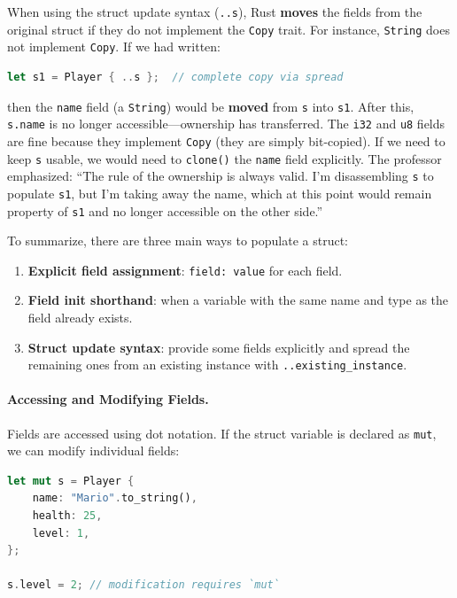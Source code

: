 \begin{warningbox}
When using the struct update syntax (\texttt{..s}), Rust \textbf{moves} the fields from the original struct if they do not implement the \texttt{Copy} trait. For instance, \texttt{String} does not implement \texttt{Copy}. If we had written:
\begin{lstlisting}[language=Rust]
let s1 = Player { ..s };  // complete copy via spread
\end{lstlisting}
then the \texttt{name} field (a \texttt{String}) would be \textbf{moved} from \texttt{s} into \texttt{s1}. After this, \texttt{s.name} is no longer accessible---ownership has transferred. The \texttt{i32} and \texttt{u8} fields are fine because they implement \texttt{Copy} (they are simply bit-copied). If we need to keep \texttt{s} usable, we would need to \texttt{clone()} the \texttt{name} field explicitly. The professor emphasized: ``The rule of the ownership is always valid. I'm disassembling \texttt{s} to populate \texttt{s1}, but I'm taking away the name, which at this point would remain property of \texttt{s1} and no longer accessible on the other side.''
\end{warningbox}

To summarize, there are three main ways to populate a struct:
\begin{enumerate}
    \item \textbf{Explicit field assignment}: \texttt{field: value} for each field.
    \item \textbf{Field init shorthand}: when a variable with the same name and type as the field already exists.
    \item \textbf{Struct update syntax}: provide some fields explicitly and spread the remaining ones from an existing instance with \texttt{..existing\_instance}.
\end{enumerate}

\paragraph{Accessing and Modifying Fields.} Fields are accessed using dot notation. If the struct variable is declared as \texttt{mut}, we can modify individual fields:

\begin{lstlisting}[language=Rust]
let mut s = Player {
    name: "Mario".to_string(),
    health: 25,
    level: 1,
};

s.level = 2; // modification requires `mut`
\end{lstlisting}

